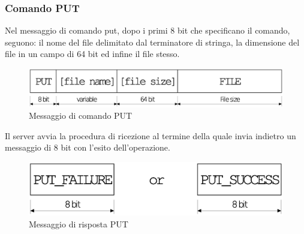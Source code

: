 \subsubsection{Comando PUT}
Nel messaggio di comando put, dopo i primi 8 bit che specificano il comando, 
seguono: il nome del file delimitato dal terminatore di stringa, la dimensione
del file in un campo di 64 bit ed infine il file stesso.
\begin{figure}[!h]
	\includegraphics[scale=0.35]{images/put_client}
	\caption{Messaggio di comando PUT}
\end{figure}
Il server avvia la procedura di ricezione al termine della quale invia indietro
un messaggio di 8 bit con l'esito dell'operazione.
\begin{figure}[!h]
	\includegraphics[scale=0.35]{images/put_server}
	\caption{Messaggio di risposta PUT}
\end{figure}
